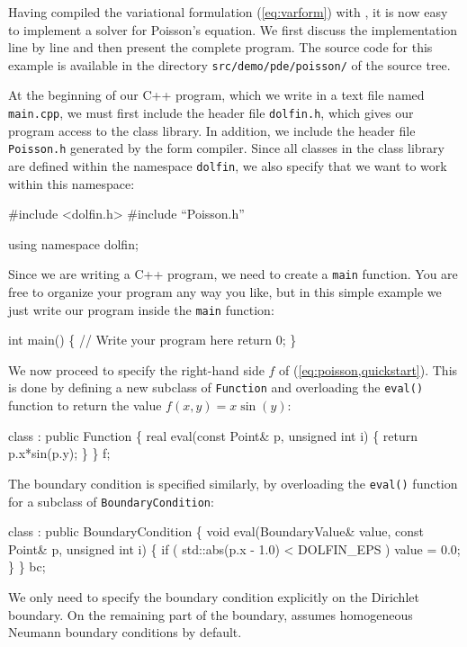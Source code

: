 Having compiled the variational formulation (\ref{eq:varform})
with \ffc{}, it is now easy to implement a solver for Poisson's
equation. We first discuss the implementation line by line and then
present the complete program. The source code for this example is
available in the directory \texttt{src/demo/pde/poisson/} of the \dolfin{}
source tree.

At the beginning of our C++ program, which we write in a text file
named \texttt{main.cpp}, we must first include the header file
\texttt{dolfin.h}, which gives our program access to the \dolfin{}
class library. In addition, we include the header file
\texttt{Poisson.h} generated by the form compiler. Since all classes
in the \dolfin{} class library are defined within the namespace
\texttt{dolfin}, we also specify that we want to work within this
namespace:
\begin{code}
  #include <dolfin.h>
  #include ``Poisson.h''
  
  using namespace dolfin;
\end{code}

Since we are writing a C++ program, we need to create a \texttt{main}
function.  You are free to organize your program any way you like, but
in this simple example we just write our program inside the
\texttt{main} function:

\begin{code}
  int main()
  \{
    // Write your program here
    return 0;
  \}
\end{code}

We now proceed to specify the right-hand side $f$ of (\ref{eq:poisson,quickstart}).
This is done by defining a new subclass of \texttt{Function}
and overloading the \texttt{eval()}
function to return the value $f(x, y) = x \sin(y)$:
\begin{code}
  class : public Function
  \{
    real eval(const Point& p, unsigned int i)
    \{
      return p.x*sin(p.y);
    \}
  \} f;
\end{code}

The boundary condition is specified similarly, by overloading the
\texttt{eval()} function for a subclass of \texttt{BoundaryCondition}:
\small
\begin{code}
  class : public BoundaryCondition
  \{
    void eval(BoundaryValue& value, const Point& p, unsigned int i)
    \{
      if ( std::abs(p.x - 1.0) < DOLFIN_EPS )
	value = 0.0;
    \}
  \} bc;
\end{code}
\normalsize
We only need to specify the boundary condition explicitly on the
Dirichlet boundary. On the remaining part of the boundary, \dolfin{}
assumes homogeneous Neumann boundary conditions by default.

